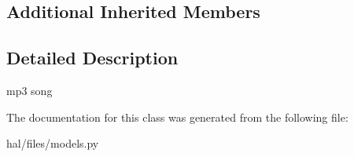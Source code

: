\subsection*{Additional Inherited Members}


\subsection{Detailed Description}
\begin{DoxyVerb}mp3 song \end{DoxyVerb}
 

The documentation for this class was generated from the following file\+:\begin{DoxyCompactItemize}
\item 
hal/files/models.\+py\end{DoxyCompactItemize}
